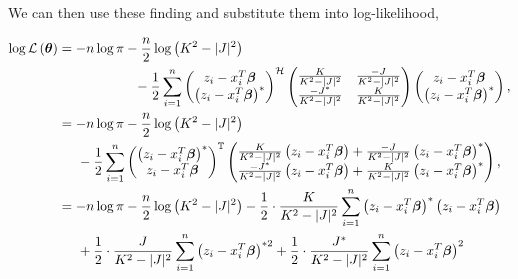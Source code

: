 \documentclass[honours,12pt]{unswthesis}
\newcommand{\T}{\mathbb{T}}
\newcommand{\ta}{\bm{\theta}}
\newcommand{\ct}{\mathcal{H}}
\numberwithin{equation}{section}
\begin{document}
\noindent We can then use these finding and substitute them into log-likelihood,

\begin{align*}
    \log{ \mathcal{L} \left( \ta \right)} &= - n \log{ \pi } - \frac{n}{2} \log { \left( K^{2} - |J|^{2} \right) }  \\
    &\hspace{2cm} - \frac{1}{2} \sum_{i=1}^{n}
    \begin{pmatrix}
        z_{i} - x_{i}^{T} \bm{\beta} \\
        \left( z_{i} - x_{i}^{T} \bm{\beta} \right)^{*}
    \end{pmatrix}^{\ct}
    \begin{pmatrix}
        \frac{K}{K^{2} - |J|^{2}} & \frac{-J}{K^{2} - |J|^{2}} \\
        \frac{-J^{*}}{K^{2} - |J|^{2}} & \frac{K}{K^{2} - |J|^{2}}
    \end{pmatrix} 
    \begin{pmatrix}
        z_{i} - x_{i}^{T} \bm{\beta} \\
        \left( z_{i} - x_{i}^{T} \bm{\beta} \right)^{*}
    \end{pmatrix}, \\
    &= - n \log{ \pi } - \frac{n}{2} \log { \left( K^{2} - |J|^{2} \right) }  \\
    &\hspace{0.5cm} - \frac{1}{2} \sum_{i=1}^{n}
    \begin{pmatrix}
        \left( z_{i} - x_{i}^{T} \bm{\beta} \right)^{*} \\
        z_{i} - x_{i}^{T} \bm{\beta}
    \end{pmatrix}^{\T}
    \begin{pmatrix}
        \frac{K}{K^{2} - |J|^{2}}\left( z_{i} - x_{i}^{T} \bm{\beta} \right) + \frac{-J}{K^{2} - |J|^{2}}\left( z_{i} - x_{i}^{T} \bm{\beta} \right)^{*} \\
        \frac{-J^{*}}{K^{2} - |J|^{2}}\left( z_{i} - x_{i}^{T} \bm{\beta} \right) + \frac{K}{K^{2} - |J|^{2}}\left( z_{i} - x_{i}^{T} \bm{\beta} \right)^{*}
    \end{pmatrix}, \\
    &= - n \log{ \pi } - \frac{n}{2} \log { \left( K^{2} - |J|^{2} \right) } - \frac{1}{2} \cdot \frac{K}{K^{2} - |J|^{2}} \sum_{i=1}^{n} \left( z_{i} - x_{i}^{T} \bm{\beta} \right)^{*} \left( z_{i} - x_{i}^{T} \bm{\beta} \right) \\
    &\hspace{0.5cm} + \frac{1}{2} \cdot \frac{J}{K^{2} - |J|^{2}} \sum_{i=1}^{n} \left( z_{i} - x_{i}^{T} \bm{\beta} \right)^{*2} + \frac{1}{2} \cdot \frac{J^{*}}{K^{2} - |J|^{2}} \sum_{i=1}^{n} \left( z_{i} - x_{i}^{T} \bm{\beta} \right)^{2} \\

\end{align*}
\end{document}
